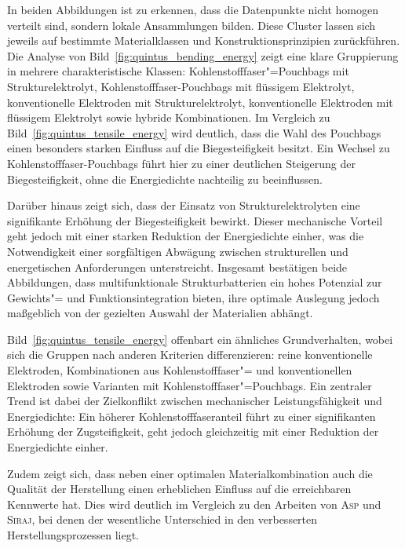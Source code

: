 In beiden Abbildungen ist zu erkennen, dass die Datenpunkte nicht homogen verteilt sind, sondern lokale Ansammlungen bilden. Diese Cluster lassen sich jeweils auf bestimmte Materialklassen und Konstruktionsprinzipien zurückführen. Die Analyse von Bild~\ref{fig:quintus_bending_energy} zeigt eine klare Gruppierung in mehrere charakteristische Klassen: Kohlenstofffaser"=Pouchbags mit Strukturelektrolyt, Kohlenstofffaser-Pouchbags mit flüssigem Elektrolyt, konventionelle Elektroden mit Strukturelektrolyt, konventionelle Elektroden mit flüssigem Elektrolyt sowie hybride Kombinationen. Im Vergleich zu Bild~\ref{fig:quintus_tensile_energy} wird deutlich, dass die Wahl des Pouchbags einen besonders starken Einfluss auf die Biegesteifigkeit besitzt. Ein Wechsel zu Kohlenstofffaser-Pouchbags führt hier zu einer deutlichen Steigerung der Biegesteifigkeit, ohne die Energiedichte nachteilig zu beeinflussen.

Darüber hinaus zeigt sich, dass der Einsatz von Strukturelektrolyten eine signifikante Erhöhung der Biegesteifigkeit bewirkt. Dieser mechanische Vorteil geht jedoch mit einer starken Reduktion der Energiedichte einher, was die Notwendigkeit einer sorgfältigen Abwägung zwischen strukturellen und energetischen Anforderungen unterstreicht. Insgesamt bestätigen beide Abbildungen, dass multifunktionale Strukturbatterien ein hohes Potenzial zur Gewichts"= und Funktionsintegration bieten, ihre optimale Auslegung jedoch maßgeblich von der gezielten Auswahl der Materialien abhängt.

Bild~\ref{fig:quintus_tensile_energy} offenbart ein ähnliches Grundverhalten, wobei sich die Gruppen nach anderen Kriterien differenzieren: reine konventionelle Elektroden, Kombinationen aus Kohlenstofffaser"= und konventionellen Elektroden sowie Varianten mit Kohlenstofffaser"=Pouchbags. Ein zentraler Trend ist dabei der Zielkonflikt zwischen mechanischer Leistungsfähigkeit und Energiedichte: Ein höherer Kohlenstofffaseranteil führt zu einer signifikanten Erhöhung der Zugsteifigkeit, geht jedoch gleichzeitig mit einer Reduktion der Energiedichte einher.

Zudem zeigt sich, dass neben einer optimalen Materialkombination auch die Qualität der Herstellung einen erheblichen Einfluss auf die erreichbaren Kennwerte hat. Dies wird deutlich im Vergleich zu den Arbeiten von \textsc{Asp}\cite{Asp2021} und \textsc{Siraj}\cite{Siraj2023}, bei denen der wesentliche Unterschied in den verbesserten Herstellungsprozessen liegt.





